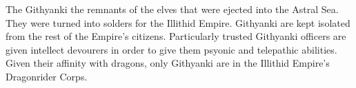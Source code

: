 The Githyanki the remnants of the elves that were ejected into the Astral Sea.
They were turned into solders for the Illithid Empire.
Githyanki are kept isolated from the rest of the Empire's citizens.
Particularly trusted Githyanki officers are given intellect devourers in order to give them psyonic and telepathic abilities.
Given their affinity with dragons, only Githyanki are in the Illithid Empire's Dragonrider Corps.